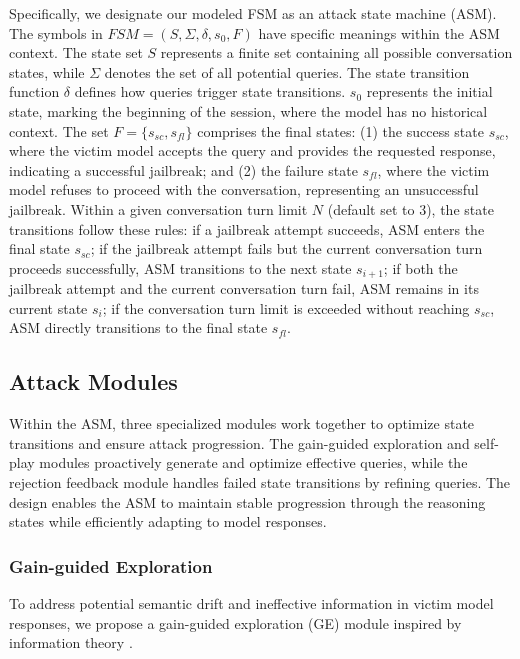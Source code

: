 Specifically, we designate our modeled FSM as an attack state machine (ASM). The symbols in $FSM = (S,\Sigma,\delta,s_{0},F)$ have specific meanings within the ASM context. The state set $S$ represents a finite set containing all possible conversation states, while $\Sigma$ denotes the set of all potential queries. The state transition function $\delta$ defines how queries trigger state transitions. $s_{0}$ represents the initial state, marking the beginning of the session, where the model has no historical context. The set $F=\{s_{sc},s_{fl}\}$ comprises the final states: (1) the success state $s_{sc}$, where the victim model accepts the query and provides the requested response, indicating a successful jailbreak; and (2) the failure state $s_{fl}$, where the victim model refuses to proceed with the conversation, representing an unsuccessful jailbreak. Within a given conversation turn limit $N$ (default set to 3), the state transitions follow these rules:  if a jailbreak attempt succeeds, ASM enters the final state $s_{sc}$;  if the jailbreak attempt fails but the current conversation turn proceeds successfully, ASM transitions to the next state $s_{i+1}$;  if both the jailbreak attempt and the current conversation turn fail, ASM remains in its current state $s_{i}$;  if the conversation turn limit is exceeded without reaching $s_{sc}$, ASM directly transitions to the final state $s_{fl}$.


\subsection{Attack Modules} \label{sec:m3}

Within the ASM, three specialized modules work together to optimize state transitions and ensure attack progression. The gain-guided exploration and self-play modules proactively generate and optimize effective queries, while the rejection feedback module handles failed state transitions by refining queries. The design enables the ASM to maintain stable progression through the reasoning states while efficiently adapting to model responses.

\subsubsection{Gain-guided Exploration}

To address potential semantic drift and ineffective information in victim model responses, we propose a gain-guided exploration (GE) module inspired by information theory \cite{shannon}. 

